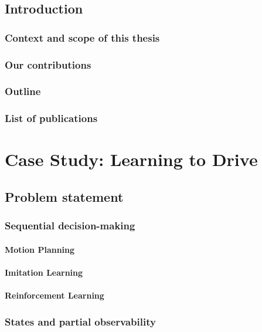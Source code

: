 \setcounter{mtc}{-1}
\adjustmtc


%

\chapter{Introduction}
\section{Context and scope of this thesis}
\section{Our contributions}
\section{Outline}
\section{List of publications}
\part{Case Study: Learning to Drive}
\chapter{Problem statement}
\section{Sequential decision-making}
\subsection*{Motion Planning}
\subsection*{Imitation Learning}
\subsection*{Reinforcement Learning}
\section{States and partial observability}
